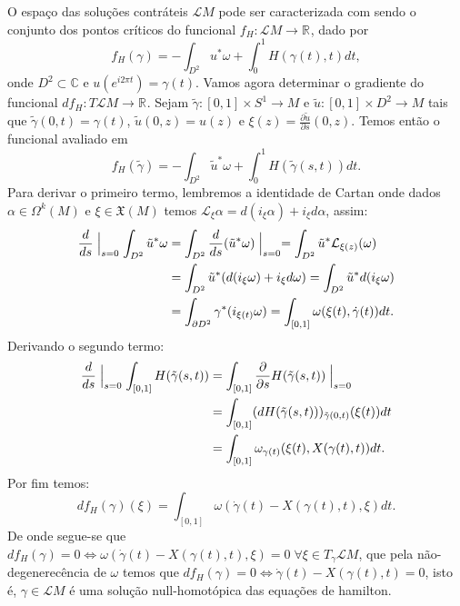 \documentclass[12pt]{book}
\newcommand{\derivadaparcial}[2]{\frac{\partial #1}{\partial #2}}
\newcommand{\real}[1]{\mathbb{R}^{#1}}
\newcommand{\solucoesperiodicascontrateis}{\mathcal{L}M}
\begin{document}
	O espaço das soluções contráteis $\solucoesperiodicascontrateis$ pode ser caracterizada com sendo o conjunto dos pontos críticos do funcional $f_{H}:\solucoesperiodicascontrateis \to \real{}$, dado por
	$$
	f_{H}(\gamma) = -\int_{D^{2}}u^{*}\omega + \int_{0}^{1}H(\gamma(t), t)dt,
	$$
	onde $D^{2} \subset \mathbb{C}$ e $u(e^{i2\pi t}) = \gamma(t)$. Vamos agora determinar o gradiente do funcional $df_{H}: T\solucoesperiodicascontrateis \to \real{}$. Sejam $\tilde{\gamma}:[0,1] \times S^{1} \to M$  e $\tilde{u}:[0,1] \times D^{2} \to M$ tais que $\tilde{\gamma}(0,t) = \gamma(t)$, $\tilde{u}(0,z) = u(z)$ e $\xi(z) = \derivadaparcial{\tilde{u}}{s}(0,z)$. Temos então o funcional avaliado em
	$$
	f_{H}(\tilde{\gamma}) = -\int_{D^{2}}\tilde{u}^{*}\omega + \int_{0}^{1}H(\tilde{\gamma}(s,t))dt.
	$$
	Para derivar o primeiro termo, lembremos a identidade de Cartan onde dados $\alpha \in \Omega^{k}(M)$ e $\xi \in \mathfrak{X}(M)$ temos $\mathcal{L}_{\xi}\alpha = d(i_{\xi}\alpha) + i_{\xi}d\alpha$, assim:
	$$
	\begin{aligned}
	\frac{d}{ds} \Bigm\lvert_{s=0} \int_{D^{2}}\tilde{u}^{*}\omega &=\int_{D^{2}}\frac{d}{ds} (\tilde{u}^{*}\omega)\Bigm\lvert_{s=0}  =\int_{D^{2}}\tilde{u}^{*} \mathcal{L}_{\xi(z)}(\omega)
	\\
	&=\int_{D^{2}}\tilde{u}^{*} (d(i_{\xi}\omega) + i_{\xi}d\omega) =\int_{D^{2}}\tilde{u}^{*} d(i_{\xi}\omega)
	\\
	&=\int_{\partial D^{2}}	\gamma^{*} (i_{\xi(t)}\omega) = \int_{[0,1]} \omega(\xi(t), \dot{\gamma}(t))dt.
	\end{aligned}
	$$
	Derivando o segundo termo:
	$$
	\begin{aligned}
	\frac{d}{ds} \Bigm\lvert_{s=0} \int_{[0,1]} H(\tilde{\gamma}(s,t)) 
	&= \int_{[0,1]} \derivadaparcial{}{s} H(\tilde{\gamma}(s,t)) \Bigm\lvert_{s=0}
	\\
	&= \int_{[0,1]} (dH(\tilde{\gamma}(s,t)))_{\tilde{\gamma}(0,t)}(\xi(t))dt
	\\
	&= \int_{[0,1]} \omega_{\gamma(t)}(\xi(t), X(\gamma(t), t))dt. 
	\end{aligned}
	$$
	Por fim temos:
	$$
	df_{H}(\gamma)(\xi) = \int_{[0,1]} \omega(\dot{\gamma}(t) - X(\gamma(t), t), \xi)dt.
	$$
	De onde segue-se que $df_{H}(\gamma) = 0 \iff \omega(\dot{\gamma}(t) - X(\gamma(t), t), \xi)=0\; \forall \xi \in T_{\gamma}\solucoesperiodicascontrateis$, que pela não-degenerecência de $\omega$ temos que $df_{H}(\gamma) = 0 \iff \dot{\gamma}(t) - X(\gamma(t), t)=0$, isto é, $\gamma \in \solucoesperiodicascontrateis$ é uma solução null-homotópica das equações de hamilton.
\end{document}
